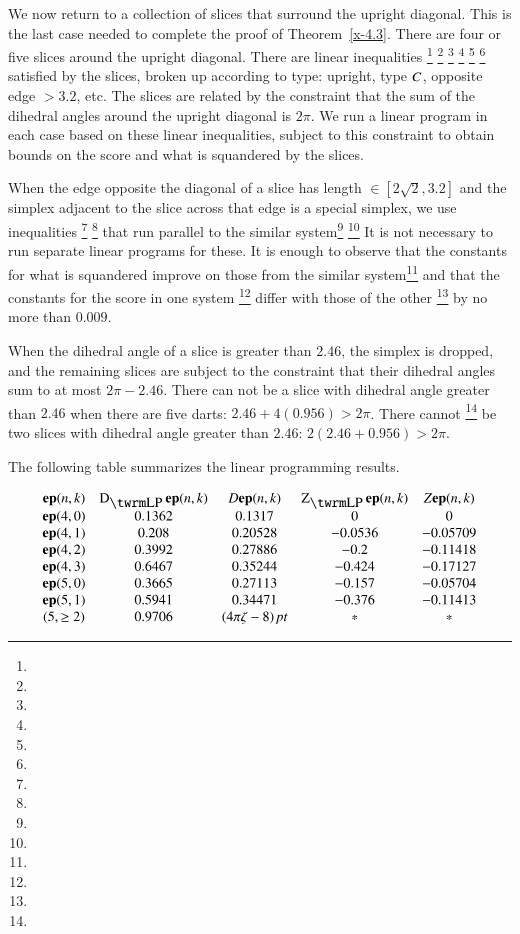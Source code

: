 We now return to a collection of slices that surround
the upright diagonal.  This is the last case needed to complete
the proof of Theorem~\ref{x-4.3}. There are four or five 
slices around the upright diagonal.
There are linear inequalities%
\footnote{} %
\footnote{} %
\footnote{} %
\footnote{} %
\footnote{} %
\footnote{} %
satisfied by the slices, broken
up according to type: upright, type $C$, opposite edge $>3.2$,
etc. The slices are related by the constraint that the
sum of the dihedral angles around the upright diagonal is $2\pi$.
We run a linear program in each case based on these linear
inequalities, subject to this constraint to obtain bounds on the
score and what is squandered by the slices.

When the edge opposite the diagonal of a slice has length
$\in[2\sqrt{2},3.2]$ and the simplex adjacent to the slice
across that edge is a special simplex, we use inequalities%
\footnote{} %
\footnote{} %
that run parallel to the similar system\footnote{} %
\footnote{} %
It is not
necessary to run separate linear programs for these.  It is enough to
observe that the constants for what is squandered improve on those from
the similar system\footnote{} %
and that the constants for the score in one system%
\footnote{} %
differ with those of the other%
\footnote{} %
by no more than $0.009$.

When the dihedral angle of a slice is greater than $2.46$,
the simplex is dropped, and the remaining slices are subject
to the constraint that their dihedral angles sum to at most $2\pi-2.46$.
There can not be a slice with dihedral angle greater than
$2.46$ when there are five darts: $2.46+4 (0.956)>2\pi$. There cannot%
\footnote{} %
be two slices with dihedral angle greater than $2.46$:
$2(2.46+0.956)>2\pi$.

The following table summarizes the linear programming results.

$$
\begin{matrix}
\y{(n,k)}   &   \DLP\y{(n,k)} & D\y{(n,k)}      &\ZLP\y{(n,k)}  &Z\y{(n,k)}\\
\y{(4,0)}   &   0.1362  &   0.1317  &   0   &   0\\
\y{(4,1)}   &   0.208   &   0.20528 &-0.0536&   -0.05709\\
\y{(4,2)}   &   0.3992  &   0.27886 &-0.2   &   -0.11418\\
\y{(4,3)}   &  0.6467   &   0.35244 &-0.424 &   -0.17127\\
\y{(5,0)}   &   0.3665  &   0.27113 &-0.157 &   -0.05704\\
\y{(5,1)}   &  0.5941   &   0.34471 &-0.376 &   -0.11413\\
(5,\ge2)&  0.9706   &  \squander    &*          &   *
\end{matrix}
$$

